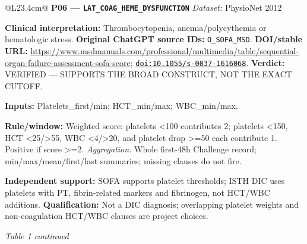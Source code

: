 \begin{tabular}{@{}L{23.4cm}@{}}
\addlinespace[3pt]
\midrule
\textbf{P06 --- \nolinkurl{LAT_COAG_HEME_DYSFUNCTION}} \hfill \textit{Dataset:} PhysioNet 2012\par\textbf{Clinical interpretation:} Thrombocytopenia, anemia/polycythemia or hematologic stress. \textbf{Original ChatGPT source IDs:} \nolinkurl{O_SOFA_MSD}. \textbf{DOI/stable URL:} \url{https://www.msdmanuals.com/professional/multimedia/table/sequential-organ-failure-assessment-sofa-score}; \allowbreak \href{https://doi.org/10.1055/s-0037-1616068}{\nolinkurl{doi:10.1055/s-0037-1616068}}. \textbf{Verdict:} VERIFIED --- SUPPORTS THE BROAD CONSTRUCT, NOT THE EXACT CUTOFF.\par\textbf{Inputs:} Platelets\_first/min; HCT\_min/max; WBC\_min/max.\par\textbf{Rule/window:} Weighted score: platelets <100 contributes 2; platelets <150, HCT <25/>55, WBC <4/>20, and platelet drop >=50 each contribute 1. Positive if score >=2. \textit{Aggregation:} Whole first-48h Challenge record; min/max/mean/first/last summaries; missing clauses do not fire.\par\textbf{Independent support:} SOFA supports platelet thresholds; ISTH DIC uses platelets with PT, fibrin-related markers and fibrinogen, not HCT/WBC additions. \textbf{Qualification:} Not a DIC diagnosis; overlapping platelet weights and non-coagulation HCT/WBC clauses are project choices. \\
\addlinespace[3pt]
\midrule
\bottomrule
\end{tabular}
\clearpage
\textit{Table 1 continued}\par
